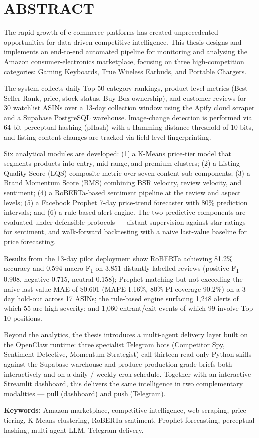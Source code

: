 \chapter*{ABSTRACT}

The rapid growth of e-commerce platforms has created unprecedented
opportunities for data-driven competitive intelligence. This thesis
designs and implements an end-to-end automated pipeline for monitoring
and analysing the Amazon consumer-electronics marketplace, focusing on
three high-competition categories: Gaming Keyboards, True Wireless
Earbuds, and Portable Chargers.

The system collects daily Top-50 category rankings, product-level metrics
(Best Seller Rank, price, stock status, Buy Box ownership), and customer
reviews for 30 watchlist ASINs over a 13-day collection window using the
Apify cloud scraper and a Supabase PostgreSQL warehouse. Image-change
detection is performed via 64-bit perceptual hashing (pHash) with a
Hamming-distance threshold of 10 bits, and listing content changes are
tracked via field-level fingerprinting.

Six analytical modules are developed: (1) a K-Means price-tier model that
segments products into entry, mid-range, and premium clusters; (2) a
Listing Quality Score (LQS) composite metric over seven content
sub-components; (3) a Brand Momentum Score (BMS) combining BSR velocity,
review velocity, and sentiment; (4) a RoBERTa-based sentiment pipeline at
the review and aspect levels; (5) a Facebook Prophet 7-day price-trend
forecaster with 80\% prediction intervals; and (6) a rule-based alert
engine. The two predictive components are evaluated under defensible
protocols --- distant supervision against star ratings for sentiment, and
walk-forward backtesting with a naive last-value baseline for price
forecasting.

Results from the 13-day pilot deployment show RoBERTa achieving 81.2\%
accuracy and 0.594 macro-F\textsubscript{1} on 3{,}851 distantly-labelled
reviews (positive F\textsubscript{1} 0.908, negative 0.715, neutral 0.158);
Prophet matching but not exceeding the naive last-value MAE of \$0.601
(MAPE 1.16\%, 80\% PI coverage 90.2\%) on a 3-day hold-out across 17
ASINs; the rule-based engine surfacing 1{,}248 alerts of which 55 are
high-severity; and 1{,}060 entrant/exit events of which 99 involve Top-10
positions.

Beyond the analytics, the thesis introduces a multi-agent delivery layer
built on the OpenClaw runtime: three specialist Telegram bots
(Competitor Spy, Sentiment Detective, Momentum Strategist) call thirteen
read-only Python skills against the Supabase warehouse and produce
production-grade briefs both interactively and on a daily / weekly cron
schedule. Together with an interactive Streamlit dashboard, this delivers
the same intelligence in two complementary modalities --- pull
(dashboard) and push (Telegram).

\vspace{0.5cm}
\noindent\textbf{Keywords:} Amazon marketplace, competitive intelligence,
web scraping, price tiering, K-Means clustering, RoBERTa sentiment,
Prophet forecasting, perceptual hashing, multi-agent LLM, Telegram delivery.

